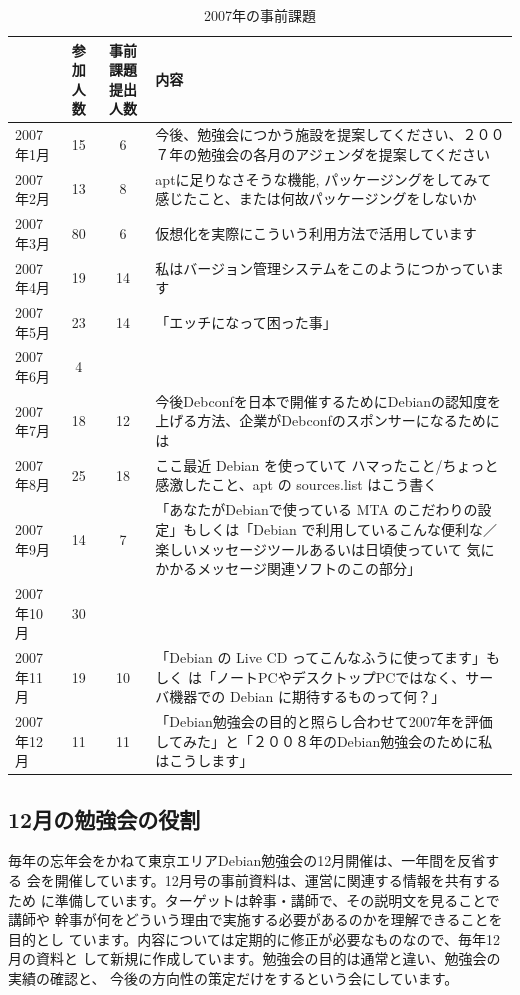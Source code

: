 \documentclass[mingoth,a4paper]{jsarticle}
\begin{document}
\begin{table}[h]
 \caption{2007年の事前課題}
 \begin{center} 
  \begin{tabular}{|l|c|c|p{20em}|}
 \hline
 & 参加人数 & 事前課題提出人数 & 内容\\
 \hline
 2007年1月 & 15 & 6 & 今後、勉強会につかう施設を提案してください、２００７年の勉強会の各月のアジェンダを提案してください\\
 2007年2月 & 13 & 8 & aptに足りなさそうな機能, パッケージングをしてみて感じたこと、または何故パッケージングをしないか\\
 2007年3月 & 80 & 6 & 仮想化を実際にこういう利用方法で活用しています\\
 2007年4月 & 19 & 14 & 私はバージョン管理システムをこのようにつかっています \\ 
 2007年5月 & 23 & 14 & 「エッチになって困った事」 \\
 2007年6月 & 4 & & \\
 2007年7月 & 18 & 12 & 今後Debconfを日本で開催するためにDebianの認知度を上げる方法、企業がDebconfのスポンサーになるためには \\
 2007年8月 & 25 & 18 & ここ最近 Debian を使っていて ハマったこと/ちょっと
	       感激したこと、apt の sources.list はこう書く\\
 2007年9月 & 14 & 7 & 「あなたがDebianで使っている MTA のこだわりの設定」もしくは「Debian 
 で利用しているこんな便利な／楽しいメッセージツールあるいは日頃使っていて
 気にかかるメッセージ関連ソフトのこの部分」\\
 2007年10月 & 30 & & \\
 2007年11月 & 19 & 10 & 「Debian の Live CD ってこんなふうに使ってます」もしく
	   は「ノートPCやデスクトップPCではなく、サーバ機器での Debian
	   に期待するものって何？」\\
 2007年12月 & 11 & 11 & 「Debian勉強会の目的と照らし合わせて2007年を評価してみた」と「２００８年のDebian勉強会のために私はこうします」 \\
 \hline
  \end{tabular}
 \end{center}
\end{table}

\subsection{12月の勉強会の役割}

毎年の忘年会をかねて東京エリアDebian勉強会の12月開催は、一年間を反省する
会を開催しています。12月号の事前資料は、運営に関連する情報を共有するため
に準備しています。ターゲットは幹事・講師で、その説明文を見ることで講師や
幹事が何をどういう理由で実施する必要があるのかを理解できることを目的とし
ています。内容については定期的に修正が必要なものなので、毎年12月の資料と
して新規に作成しています。勉強会の目的は通常と違い、勉強会の実績の確認と、
今後の方向性の策定だけをするという会にしています。
\end{document}
